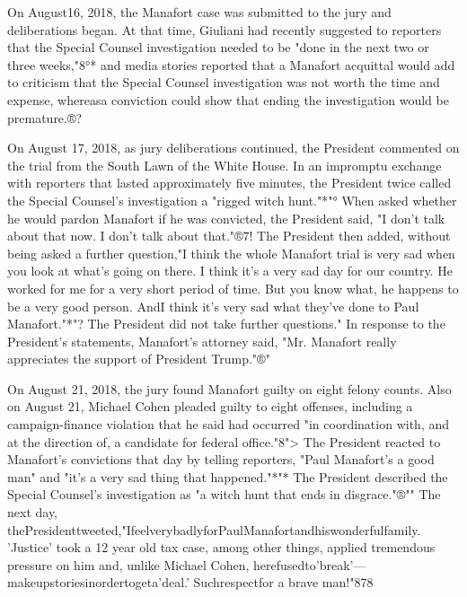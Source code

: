 On August16, 2018, the Manafort case was submitted to the jury and deliberations began.
At that time, Giuliani had recently suggested to reporters that the Special Counsel investigation needed to be "done in the next two or three weeks,"8°*
and media stories reported that a Manafort acquittal would add to criticism that the Special Counsel investigation was not worth the time and expense, whereasa conviction could show that ending the investigation would be premature.®?

On August 17, 2018, as jury deliberations continued, the President commented on the trial from the South Lawn of the White House.
In an impromptu exchange with reporters that lasted approximately five minutes, the President twice called the Special Counsel's investigation a "rigged witch hunt."*"°
When asked whether he would pardon Manafort if he was convicted, the President said, "I don't talk about that now.
I don't talk about that."®7!
The President then added, without being asked a further question,"I think the whole Manafort trial is very sad when you look at what's going on there.
I think it's a very sad day for our country.
He worked for me for a very short period of time.
But you know what, he happens to be a very good person.
AndI think it's very sad what they've done to Paul Manafort."*"?
The President did not take further questions."
In response to the President's statements, Manafort's attorney said, "Mr. Manafort really appreciates the support of President Trump."®"

On August 21, 2018, the jury found Manafort guilty on eight felony counts.
Also on August 21, Michael Cohen pleaded guilty to eight offenses, including a campaign-finance violation that he said had occurred "in coordination with, and at the direction of, a candidate for federal office."8">
The President reacted to Manafort's convictions that day by telling reporters, "Paul Manafort's a good man" and "it's a very sad thing that happened."*"*
The President described the Special Counsel's investigation as "a witch hunt that ends in disgrace."®""
The next day, thePresidenttweeted,"IfeelverybadlyforPaulManafortandhiswonderfulfamily.
'Justice' took a 12 year old tax case, among other things, applied tremendous pressure on him and, unlike Michael Cohen, herefusedto'break'—makeupstoriesinordertogeta'deal.'
Suchrespectfor a brave man!"878

